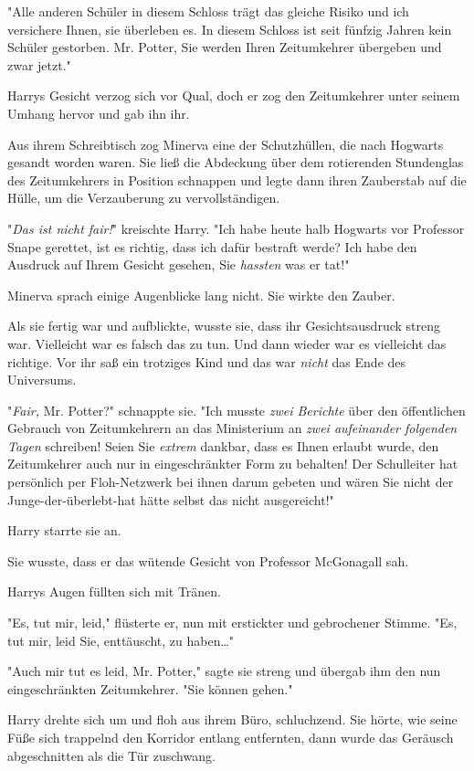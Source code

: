 {"Alle anderen Schüler in diesem Schloss trägt das gleiche Risiko und ich versichere Ihnen, sie überleben es. In diesem Schloss ist seit fünfzig Jahren kein Schüler gestorben. Mr. Potter, Sie werden Ihren Zeitumkehrer übergeben und zwar jetzt."

Harrys Gesicht verzog sich vor Qual, doch er zog den Zeitumkehrer unter seinem Umhang hervor und gab ihn ihr.

Aus ihrem Schreibtisch zog Minerva eine der Schutzhüllen, die nach Hogwarts gesandt worden waren. Sie ließ die Abdeckung über dem rotierenden Stundenglas des Zeitumkehrers in Position schnappen und legte dann ihren Zauberstab auf die Hülle, um die Verzauberung zu vervollständigen.

"\emph{Das ist nicht fair!}" kreischte Harry. "Ich habe heute halb Hogwarts vor Professor Snape gerettet, ist es richtig, dass ich dafür bestraft werde? Ich habe den Ausdruck auf Ihrem Gesicht gesehen, Sie \emph{hassten} was er tat!"

Minerva sprach einige Augenblicke lang nicht. Sie wirkte den Zauber.

Als sie fertig war und aufblickte, wusste sie, dass ihr Gesichtsausdruck streng war. Vielleicht war es falsch das zu tun. Und dann wieder war es vielleicht das richtige. Vor ihr saß ein trotziges Kind und das war \emph{nicht} das Ende des Universums.

"\emph{Fair,} Mr. Potter?" schnappte sie. "Ich musste \emph{zwei Berichte} über den öffentlichen Gebrauch von Zeitumkehrern an das Ministerium an \emph{zwei aufeinander folgenden Tagen} schreiben! Seien Sie \emph{extrem} dankbar, dass es Ihnen erlaubt wurde, den Zeitumkehrer auch nur in eingeschränkter Form zu behalten! Der Schulleiter hat persönlich per Floh-Netzwerk bei ihnen darum gebeten und wären Sie nicht der Junge-der-überlebt-hat hätte selbst das nicht ausgereicht!"

Harry starrte sie an.

Sie wusste, dass er das wütende Gesicht von Professor McGonagall sah.

Harrys Augen füllten sich mit Tränen.

"Es, tut mir, leid," flüsterte er, nun mit erstickter und gebrochener Stimme. "Es, tut mir, leid Sie, enttäuscht, zu haben…"

"Auch mir tut es leid, Mr. Potter," sagte sie streng und übergab ihm den nun eingeschränkten Zeitumkehrer. "Sie können gehen."

Harry drehte sich um und floh aus ihrem Büro, schluchzend. Sie hörte, wie seine Füße sich trappelnd den Korridor entlang entfernten, dann wurde das Geräusch abgeschnitten als die Tür zuschwang.

}
